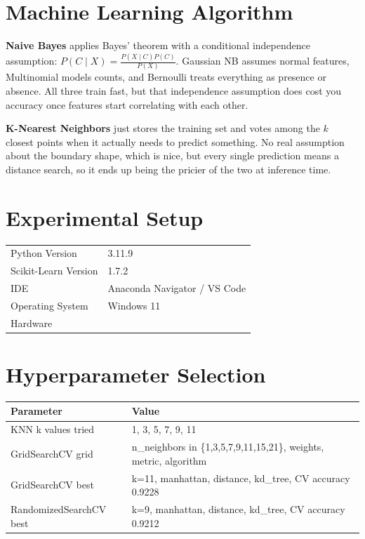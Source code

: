 \documentclass[12pt,a4paper]{article}
\begin{document}
\section{Machine Learning Algorithm}

\textbf{Naive Bayes} applies Bayes' theorem with a conditional independence assumption:
$P(C \mid X) = \frac{P(X \mid C)P(C)}{P(X)}$. Gaussian NB assumes normal features, Multinomial models
counts, and Bernoulli treats everything as presence or absence. All three train fast, but that
independence assumption does cost you accuracy once features start correlating with each other.

\textbf{K-Nearest Neighbors} just stores the training set and votes among the $k$ closest points when
it actually needs to predict something. No real assumption about the boundary shape, which is nice, but
every single prediction means a distance search, so it ends up being the pricier of the two at
inference time.

\section{Experimental Setup}
\begin{tabular}{ll}
\toprule
Python Version & 3.11.9 \\
Scikit-Learn Version & 1.7.2 \\
IDE & Anaconda Navigator / VS Code \\
Operating System & Windows 11 \\
Hardware & \\
\bottomrule
\end{tabular}

\section{Hyperparameter Selection}
\begin{tabular}{p{4.2cm}p{9.5cm}}
\toprule
Parameter & Value\\
\midrule
KNN k values tried & 1, 3, 5, 7, 9, 11 \\
GridSearchCV grid & n\_neighbors in \{1,3,5,7,9,11,15,21\}, weights, metric, algorithm \\
GridSearchCV best & k=11, manhattan, distance, kd\_tree, CV accuracy 0.9228 \\
RandomizedSearchCV best & k=9, manhattan, distance, kd\_tree, CV accuracy 0.9212 \\
\bottomrule
\end{tabular}
\end{document}

